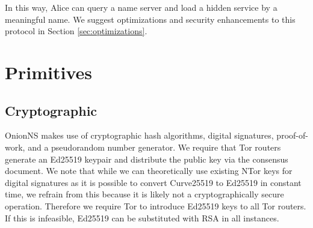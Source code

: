 In this way, Alice can query a name server and load a hidden service by a meaningful name. We suggest optimizations and security enhancements to this protocol in Section \ref{sec:optimizations}.

\section{Primitives}

\subsection{Cryptographic}
\label{sec:CryptoPrim}

OnionNS makes use of cryptographic hash algorithms, digital signatures, proof-of-work, and a pseudorandom number generator. We require that Tor routers generate an Ed25519\cite{bernstein2011high} keypair and distribute the public key via the consensus document. We note that while we can theoretically use existing NTor keys for digital signatures as it is possible to convert Curve25519 to Ed25519 in constant time, we refrain from this because it is likely not a cryptographically secure operation. Therefore we require Tor to introduce Ed25519 keys to all Tor routers. If this is infeasible, Ed25519 can be substituted with RSA in all instances.

